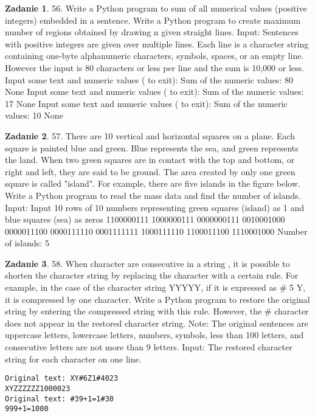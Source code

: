\documentclass[11pt]{article}
\theoremstyle{definition}
\newtheorem{zadanie}{Zadanie}
\begin{document}
\begin{zadanie}
56. Write a Python program to sum of all numerical values (positive integers) embedded in a sentence.
Write a Python program to create maximum number of regions obtained by drawing n given straight lines.
Input:
Sentences with positive integers are given over multiple lines. Each line is a character string containing one-byte alphanumeric characters, symbols, spaces, or an empty line. However the input is 80 characters or less per line and the sum is 10,000 or less.
Input some text and numeric values ( to exit):
Sum of the numeric values: 80
None
Input some text and numeric values ( to exit):
Sum of the numeric values: 17
None
Input some text and numeric values ( to exit):
Sum of the numeric values: 10
None
\end{zadanie}

\begin{zadanie}
57. There are 10 vertical and horizontal squares on a plane. Each square is painted blue and green. Blue represents the sea, and green represents the land. When two green squares are in contact with the top and bottom, or right and left, they are said to be ground. The area created by only one green square is called "island". For example, there are five islands in the figure below.
Write a Python program to read the mass data and find the number of islands.
Input:
Input 10 rows of 10 numbers representing green squares (island) as 1 and blue squares (sea) as zeros
1100000111
1000000111
0000000111
0010001000
0000011100
0000111110
0001111111
1000111110
1100011100
1110001000
Number of islands:
5
\end{zadanie}

\begin{zadanie}
58. When character are consecutive in a string , it is possible to shorten the character string by replacing the character with a certain rule. For example, in the case of the character string YYYYY, if it is expressed as \# 5 Y, it is compressed by one character.
Write a Python program to restore the original string by entering the compressed string with this rule. However, the \# character does not appear in the restored character string.
Note: The original sentences are uppercase letters, lowercase letters, numbers, symbols, less than 100 letters, and consecutive letters are not more than 9 letters.
Input:
The restored character string for each character on one line.
\begin{verbatim}
Original text: XY#6Z1#4023
XYZZZZZZ1000023
Original text: #39+1=1#30
999+1=1000
\end{verbatim}
\end{zadanie}
\end{document}
